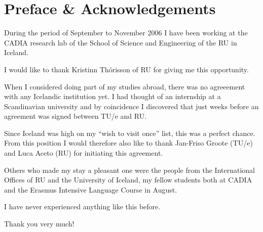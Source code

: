 \chapter*{Preface \& Acknowledgements}

During the period of September to November 2006 I have been working at the
\ac{CADIA} research lab of the School of Science and Engineering of the \ac{RU}
in Iceland.

I would like to thank Kristinn Th\'orisson of \ac{RU} for giving me this
opportunity.

When I considered doing part of my studies abroad, there was no agreeement with
any Icelandic institution yet. I had thought of an internship at a Scandinavian
university and by coincidence I discovered that just weeks before an agreement
was signed between \ac{TU/e} and \ac{RU}. 

Since Iceland was high on my ``wish to visit once'' list, this was a perfect
chance. From this position I would therefore also like to thank Jan-Friso
Groote (\ac{TU/e}) and Luca Aceto (\ac{RU}) for initiating this agreement.

Others who made my stay a pleasant one were the people from the International
Offices of \ac{RU} and the University of Iceland, my fellow students both at
\ac{CADIA} and the Erasmus Intensive Language Course in August.

I have never experienced anything like this before.

Thank you very much!
